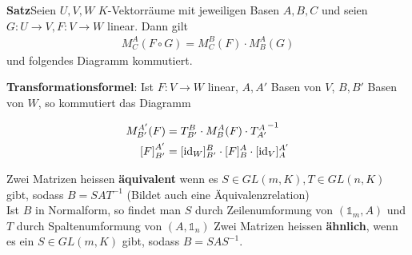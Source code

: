 \textbf{Satz}\quad Seien $U,V,W$ $K$-Vektorräume mit jeweiligen Basen $A,B,C$ und seien $G: U \rightarrow V, F: V \rightarrow W$ linear. Dann gilt
\begin{align*}
    M_{C}^{A}(F \circ G) = M_{C}^{B}(F) \cdot M_{B}^{A}(G)
\end{align*}
und folgendes Diagramm kommutiert.
\begin{center}
\end{center}
\begin{mdframed}
\textbf{Transformationsformel}: \quad Ist $F: V \rightarrow W$ linear, $A, A'$ Basen von $V$, $B,B'$ Basen von $W$, so kommutiert das Diagramm
\begin{center}
\end{center}
\begin{align*}
    M_{B'}^{A'}(F) &= T_{B'}^{B} \cdot M_{B}^{A}(F) \cdot {T_{A'}^{A}}^{-1}\\
    {[F]}_{B'}^{A'} &= [\text{id}_W]_{B'}^{B} \cdot [F]_{B}^{A} \cdot [\text{id}_V]_{A}^{A'}
\end{align*}
\end{mdframed}
Zwei Matrizen heissen \textbf{äquivalent} wenn es $S \in GL(m,K), T \in GL(n,K)$ gibt, sodass $B = S A {T}^{-1}$ (Bildet auch eine Äquivalenzrelation)\\
Ist $B$ in Normalform, so findet man $S$ durch Zeilenumformung von $(\mathds{1}_m,A)$ und $T$ durch Spaltenumformung von $(A, \mathds{1}_n)$
Zwei Matrizen heissen \textbf{ähnlich}, wenn es ein $S \in GL(m,K)$ gibt, sodass $B = S A {S}^{-1}$.\\
